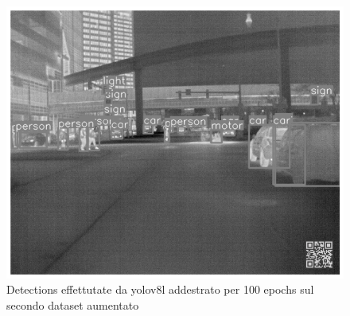 \begin{figure}[ht]
    \centering
    \includegraphics[width=1\textwidth]{files/capitoli/4-sperimentazione-risultati/assets/yolov8l-detections-special.png}
    \caption{\label{fig:yolov8l-detections}Detections effettutate da yolov8l addestrato per 100 epochs sul secondo dataset aumentato}
\end{figure}

\clearpage
